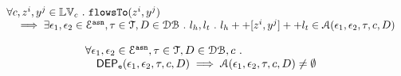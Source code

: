 %
\begin{thm}
\label{thm:alg_complete}
\[
\begin{array}{l}
  \forall c, z^i, y^j \in \mathbb{LV}_c ~.~ 
   \mathtt{flowsTo}(z^i, y^j)
  \\ \quad 
   \implies \exists \mathtt{\epsilon}_1, \mathtt{\epsilon}_2 \in \mathcal{E}^{\mathtt{{asn}}}, \mathtt{\tau} \in \mathcal{T}, D \in \mathcal{DB} ~.~
   l_h, l_t ~.~ 
   l_h ++ [z^i, y^j] ++ l_t \in \mathcal{A}(\mathtt{\epsilon}_1, \mathtt{\epsilon}_2, \mathtt{\tau}, c, D)
\end{array}
\]
\end{thm}
%
\begin{thm}
\label{thm:algeventdep_sound}
\[
\begin{array}{l}
  \forall \mathtt{\epsilon}_1, \mathtt{\epsilon}_2 \in \mathcal{E}^{\mathtt{{asn}}}, \mathtt{\tau} \in \mathcal{T}, D \in \mathcal{DB} , c ~.~
  \\ \quad 
  \mathsf{DEP_{\mathtt{e}}}(\mathtt{\epsilon}_1, \mathtt{\epsilon}_2,\mathtt{\tau}, {c}, D)
   \implies
   \mathcal{A}(\mathtt{\epsilon}_1, \mathtt{\epsilon}_2, \mathtt{\tau}, c, D) \neq \emptyset
\end{array}
\]
\end{thm}
%

